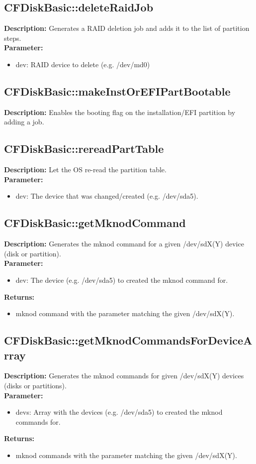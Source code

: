 \subsection{CFDiskBasic::deleteRaidJob}
\textbf{Description:} Generates a RAID deletion job and adds it to the list of partition steps.\\
\textbf{Parameter:}
\begin{itemize}
\item dev: RAID device to delete (e.g. /dev/md0)
\end{itemize}

\subsection{CFDiskBasic::makeInstOrEFIPartBootable}
\textbf{Description:} Enables the booting flag on the installation/EFI partition by adding a job.\\

\subsection{CFDiskBasic::rereadPartTable}
\textbf{Description:} Let the OS re-read the partition table.\\
\textbf{Parameter:}
\begin{itemize}
\item dev: The device that was changed/created (e.g. /dev/sda5).
\end{itemize}

\subsection{CFDiskBasic::getMknodCommand}
\textbf{Description:} Generates the mknod command for a given /dev/sdX(Y) device (disk or partition).\\
\textbf{Parameter:}
\begin{itemize}
\item dev: The device (e.g. /dev/sda5) to created the mknod command for.
\end{itemize}
\textbf{Returns:}
\begin{itemize}
\item mknod command with the parameter matching the given /dev/sdX(Y).
\end{itemize}

\subsection{CFDiskBasic::getMknodCommandsForDeviceArray}
\textbf{Description:} Generates the mknod commands for given /dev/sdX(Y) devices (disks or partitions).\\
\textbf{Parameter:}
\begin{itemize}
\item devs: Array with the devices (e.g. /dev/sda5) to created the mknod commands for.
\end{itemize}
\textbf{Returns:}
\begin{itemize}
\item mknod commands with the parameter matching the given /dev/sdX(Y).
\end{itemize}

